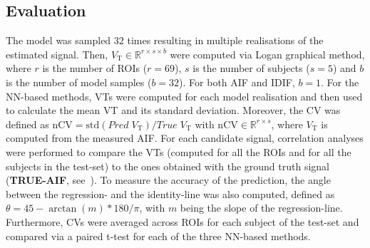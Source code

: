 
    \vspace{-0.44cm}
    
    \subsection{Evaluation}\label{sec:evaluation}
    \vspace{-0.1cm} 
            The model was sampled $32$ times resulting in multiple realisations of the estimated signal. Then, $V_{\mathrm{T}} \in \mathbb{R}^{r \times s \times b}$ were computed via Logan graphical method, where $r$ is the number of \glspl{ROI} ($r = 69$), $s$ is the number of subjects ($s = 5$) and $b$ is the number of model samples ($b = 32$). For both AIF and IDIF, $b=1$. For the \gls{NN}-based methods, \glspl{VT} were computed for each model realisation and then used to calculate the mean \gls{VT} and its standard deviation. Moreover, the \gls{CV} was defined as $\mathrm{nCV} = \mathrm{std} ( Pred \; V_{\mathrm{T}} ) / True \; V_{\mathrm{T}}$ with $\mathrm{nCV} \in \mathbb{R}^{r \times s }$, where $V_{\mathrm{T}}$ is computed from the measured \gls{AIF}. 
            For each candidate signal, correlation analyses were performed to compare the \glspl{VT} (computed for all the \glspl{ROI} and for all the subjects in the test-set) to the ones obtained with the ground truth signal (\textbf{TRUE-AIF}, see~). To measure the accuracy of the prediction, the angle between the regression- and the identity-line was also computed, defined as $\theta = 45 - \arctan(m)*180/\pi$, with $m$ being the slope of the regression-line. Furthermore, \glspl{CV} were averaged across \glspl{ROI} for each subject of the test-set and compared via a paired t-test for each of the three \gls{NN}-based methods.
       
